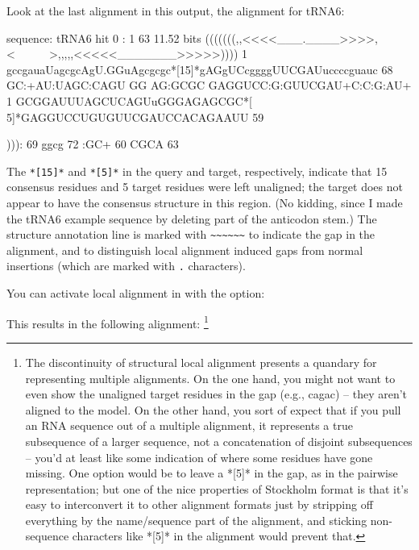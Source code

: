 
Look at the last alignment in this output, the alignment for tRNA6:

\begin{sreoutput}
sequence: tRNA6
hit 0   :      1     63    11.52 bits
           (((((((,,<<<<___.____>>>>,<~~~~~~>,,,,,<<<<<_______>>>>>))))
         1 gccgauaUagcgcAgU.GGuAgcgcgc*[15]*gAGgUCcggggUUCGAUuccccguauc 68
           GC:+AU:UAGC:CAGU GG AG:GCGC      GAGGUCC:G:GUUCGAU+C:C:G:AU+
         1 GCGGAUUUAGCUCAGUuGGGAGAGCGC*[ 5]*GAGGUCCUGUGUUCGAUCCACAGAAUU 59

           ))):
        69 ggcg 72      
           :GC+
        60 CGCA 63      
\end{sreoutput}

The \verb+*[15]*+ and \verb+*[5]*+ in the query and target,
respectively, indicate that 15 consensus residues and 5 target
residues were left unaligned; the target does not appear to have the
consensus structure in this region. (No kidding, since I made the
tRNA6 example sequence by deleting part of the anticodon stem.)  The
structure annotation line is marked with \verb+~~~~~~+ to indicate the
gap in the alignment, and to distinguish local alignment induced gaps
from normal insertions (which are marked with \verb+.+ characters).

You can activate local alignment in  with the 
option:


This results in the following alignment:
\footnote{The discontinuity of structural local alignment presents a
quandary for representing multiple alignments. On the one hand, you
might not want to even show the unaligned target residues in the gap
(e.g., cagac) -- they aren't aligned to the model. On the other hand,
you sort of expect that if you pull an RNA sequence out of a multiple
alignment, it represents a true subsequence of a larger sequence, not
a concatenation of disjoint subsequences -- you'd at least like some
indication of where some residues have gone missing. One option would
be to leave a *[5]* in the gap, as in the pairwise
representation; but one of the nice properties of Stockholm format is
that it's easy to interconvert it to other alignment formats just by
stripping off everything by the name/sequence part of the alignment,
and sticking non-sequence characters like *[5]* in the
alignment would prevent that.}


